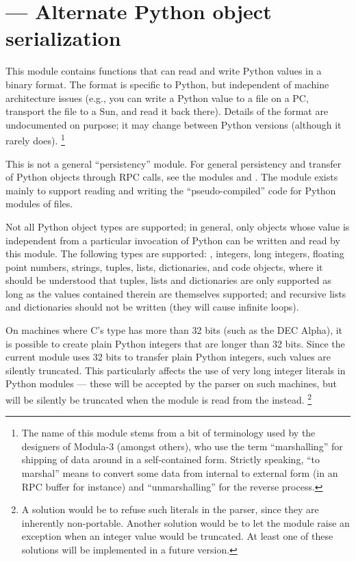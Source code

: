 \section{ ---
         Alternate Python object serialization}



This module contains functions that can read and write Python
values in a binary format.  The format is specific to Python, but
independent of machine architecture issues (e.g., you can write a
Python value to a file on a PC, transport the file to a Sun, and read
it back there).  Details of the format are undocumented on purpose;
it may change between Python versions (although it rarely does).%
\footnote{The name of this module stems from a bit of terminology used
by the designers of Modula-3 (amongst others), who use the term
``marshalling'' for shipping of data around in a self-contained form.
Strictly speaking, ``to marshal'' means to convert some data from
internal to external form (in an RPC buffer for instance) and
``unmarshalling'' for the reverse process.}

This is not a general ``persistency'' module.  For general persistency
and transfer of Python objects through RPC calls, see the modules
 and .  The  module exists
mainly to support reading and writing the ``pseudo-compiled'' code for
Python modules of  files.

Not all Python object types are supported; in general, only objects
whose value is independent from a particular invocation of Python can
be written and read by this module.  The following types are supported:
, integers, long integers, floating point numbers,
strings, tuples, lists, dictionaries, and code objects, where it
should be understood that tuples, lists and dictionaries are only
supported as long as the values contained therein are themselves
supported; and recursive lists and dictionaries should not be written
(they will cause infinite loops).

 On machines where C's  type has more than
32 bits (such as the DEC Alpha), it
is possible to create plain Python integers that are longer than 32
bits.  Since the current  module uses 32 bits to
transfer plain Python integers, such values are silently truncated.
This particularly affects the use of very long integer literals in
Python modules --- these will be accepted by the parser on such
machines, but will be silently be truncated when the module is read
from the  instead.%
\footnote{A solution would be to refuse such literals in the parser,
since they are inherently non-portable.  Another solution would be to
let the  module raise an exception when an integer
value would be truncated.  At least one of these solutions will be
implemented in a future version.}

